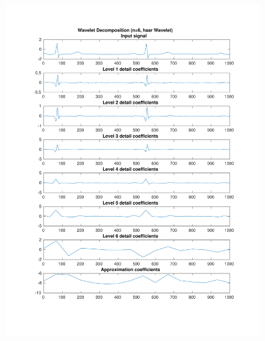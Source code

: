 \documentclass[11pt,a4paper]{article}
\begin{document}
\begin{figure}[H]
\centering
\begin{minipage}{0.48\textwidth}
	\centering
	\includegraphics[width=\textwidth]{fig/123l1_dwt1.pdf}
\end{minipage}
\begin{minipage}{0.48\textwidth}
	\centering

\end{minipage}
\end{figure}
\end{document}

